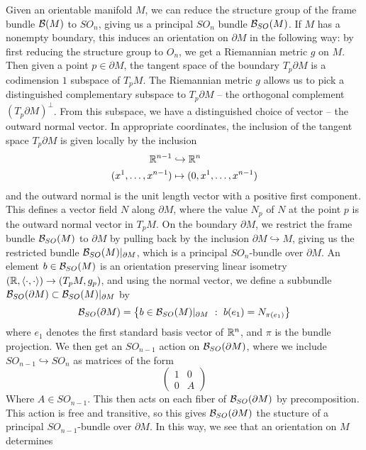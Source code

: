 %
Given an orientable manifold $M$, we can reduce the structure group
of the frame bundle $\mathcal{B}(M)$ to $SO_n$, giving us a principal $SO_n$ bundle
$\mathcal{B}_{SO}(M)$. If $M$ has a nonempty boundary, this induces an orientation on
$\partial M$ in the following way: by first reducing the structure group to $O_n$,
we get a Riemannian metric $g$ on $M$. Then given a point $p \in \partial M$,
the tangent space of the boundary $T_p\partial M$ is a codimension $1$ subspace
of $T_pM$. The Riemannian metric $g$ allows us to pick a distinguished complementary
subspace to $T_p\partial M$ -- the orthogonal complement $(T_p \partial M)^\perp$.
From this subspace, we have a distinguished choice of vector -- the outward
normal vector. In appropriate coordinates, the inclusion of the tangent space
$T_p\partial M$ is given locally by the inclusion
%
\begin{align*}
\mathbb{R}^{n-1} &\hookrightarrow \mathbb{R}^n \\
(x^1, \ldots, x^{n-1}) &\mapsto (0, x^1, \ldots, x^{n-1})
\end{align*}
%
and the outward normal is the unit length vector with a positive first component.
This defines a vector field $N$ along $\partial M$, where the value $N_p$
of $N$ at the point $p$ is the outward normal vector in $T_pM$.
On the boundary $\partial M$, we restrict the frame bundle $\mathcal{B}_{SO}(M)$
to $\partial M$ by pulling back by the inclusion $\partial M \hookrightarrow M$,
giving us the restricted bundle $\mathcal{B}_{SO}(M)\vert_{\partial M}$, which is a principal
$SO_n$-bundle over $\partial M$. An element $b \in \mathcal{B}_{SO}(M)$ is an orientation
preserving linear isometry $(\mathbb{R}, \langle \cdot,\cdot\rangle) \to (T_pM, g_p)$, and
using the normal vector, we define a subbundle
$\mathcal{B}_{SO}(\partial M) \subset \mathcal{B}_{SO}(M)\vert_{\partial M}$ by
\[
\mathcal{B}_{SO}(\partial M) = \left\lbrace b \in \mathcal{B}_{SO}(M)\vert_{\partial M} ~:~
b(e_1) = N_{\pi(e_1)} \right\rbrace
\]
where $e_1$ denotes the first standard basis vector of $\mathbb{R}^n$, and $\pi$ is
the bundle projection. We then get an $SO_{n-1}$ action on $\mathcal{B}_{SO}(\partial M)$,
where we include $SO_{n-1} \hookrightarrow SO_n$ as matrices of the form
\[
\begin{pmatrix}
1 & 0 \\
0 & A
\end{pmatrix}
\]
Where $A \in SO_{n-1}$. This then acts on each fiber of $\mathcal{B}_{SO}(\partial M)$
by precomposition. This action is free and transitive, so this gives
$\mathcal{B}_{SO}(\partial M)$ the stucture of a principal $SO_{n-1}$-bundle over
$\partial M$. In this way, we see that an orientation on $M$ determines
